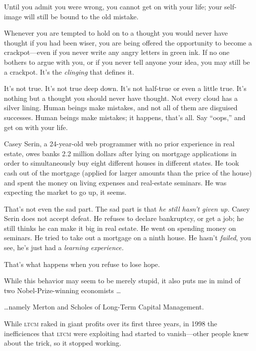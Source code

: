 {
 Until you admit you were wrong, you cannot get on with your life;
your self-image will still be bound to the old mistake.}

{
 Whenever you are tempted to hold on to a thought you would never
have thought if you had been wiser, you are being offered the
opportunity to become a crackpot---even if you never write any angry
letters in green ink. If no one bothers to argue with you, or if you
never tell anyone your idea, you may still be a crackpot.
It's the \textit{clinging} that defines it.}

{
 It's not true. It's not true deep
down. It's not half-true or even a little true.
It's nothing but a thought you should never have
thought. Not every cloud has a silver lining. Human beings make
mistakes, and not all of them are disguised successes. Human beings
make mistakes; it happens, that's all. Say
``oops,'' and get on with your
life.}

\myendsectiontext


{
 Casey Serin, a 24-year-old web programmer with no prior experience
in real estate, owes banks 2.2 million dollars after lying on mortgage
applications in order to simultaneously buy eight different houses in
different states. He took cash out of the mortgage (applied for larger
amounts than the price of the house) and spent the money on living
expenses and real-estate seminars. He was expecting the market to go
up, it seems. }

{
 That's not even the sad part. The sad part is that
\textit{he still hasn't given up.} Casey Serin does not
accept defeat. He refuses to declare bankruptcy, or get a job; he still
thinks he can make it big in real estate. He went on spending money on
seminars. He tried to take out a mortgage on a ninth house. He
hasn't \textit{failed}, you see, he's
just had a \textit{learning experience.}}

{
 That's what happens when you refuse to lose hope.}

{
 While this behavior may seem to be merely stupid, it also puts me
in mind of two Nobel-Prize-winning economists \ldots}

{
 \ldots namely Merton and Scholes of Long-Term Capital Management.}

{
 While \textsc{ltcm} raked in giant profits over its first three years, in
1998 the inefficiences that \textsc{ltcm} were exploiting had started to
vanish---other people knew about the trick, so it stopped working.}

